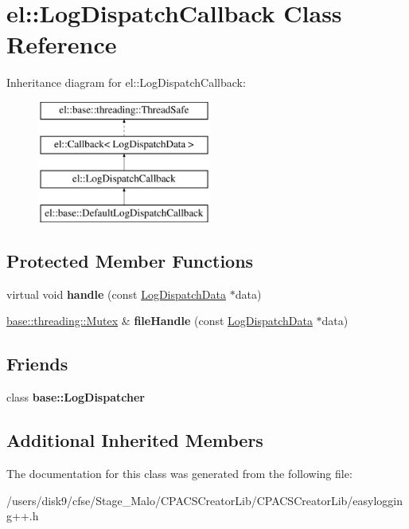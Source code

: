 \hypertarget{classel_1_1LogDispatchCallback}{\section{el\-:\-:Log\-Dispatch\-Callback Class Reference}
\label{classel_1_1LogDispatchCallback}
}
Inheritance diagram for el\-:\-:Log\-Dispatch\-Callback\-:\begin{figure}[H]
\begin{center}
\leavevmode
\includegraphics[height=4.000000cm]{classel_1_1LogDispatchCallback}
\end{center}
\end{figure}
\subsection*{Protected Member Functions}
\begin{DoxyCompactItemize}
\item 
\hypertarget{classel_1_1LogDispatchCallback_a7f1af862ca86db91ce282fb252aff6c4}{virtual void {\bfseries handle} (const \hyperlink{classel_1_1LogDispatchData}{Log\-Dispatch\-Data} $\ast$data)}\label{classel_1_1LogDispatchCallback_a7f1af862ca86db91ce282fb252aff6c4}

\item 
\hypertarget{classel_1_1LogDispatchCallback_ab684f5dee1dcced92f61a431acb7d3fb}{\hyperlink{classel_1_1base_1_1threading_1_1internal_1_1NoMutex}{base\-::threading\-::\-Mutex} \& {\bfseries file\-Handle} (const \hyperlink{classel_1_1LogDispatchData}{Log\-Dispatch\-Data} $\ast$data)}\label{classel_1_1LogDispatchCallback_ab684f5dee1dcced92f61a431acb7d3fb}

\end{DoxyCompactItemize}
\subsection*{Friends}
\begin{DoxyCompactItemize}
\item 
\hypertarget{classel_1_1LogDispatchCallback_a84d22f9ad5b796e49ff5f15a8c32773d}{class {\bfseries base\-::\-Log\-Dispatcher}}\label{classel_1_1LogDispatchCallback_a84d22f9ad5b796e49ff5f15a8c32773d}

\end{DoxyCompactItemize}
\subsection*{Additional Inherited Members}


The documentation for this class was generated from the following file\-:\begin{DoxyCompactItemize}
\item 
/users/disk9/cfse/\-Stage\-\_\-\-Malo/\-C\-P\-A\-C\-S\-Creator\-Lib/\-C\-P\-A\-C\-S\-Creator\-Lib/easylogging++.\-h\end{DoxyCompactItemize}
